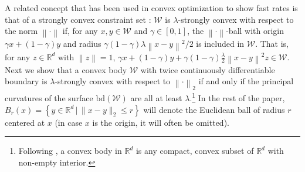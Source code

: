\documentclass[english]{article}
\newcommand{\cW}{\mathcal{W}}
\newcommand{\R}{\mathbb{R}}
\newcommand{\set}[2]{\left\{#1 \,\vert\, #2 \right\}}
\newcommand{\norm}[1]{\left\| #1 \right\|}
\newcommand{\bd}{\mathrm{bd}}
\begin{document}
A related concept that has been used in convex optimization to show fast rates is that of a strongly convex constraint set \citep{LePo66,garber2014faster}:
$\cW$ is $\lambda$-strongly convex with respect to the norm $\norm{\cdot}$ if, for  any $x,y\in \cW$ and $\gamma\in [0,1]$, the $\norm{\cdot}$-ball with origin $\gamma x + (1-\gamma) y$ and radius $\gamma(1-\gamma) \lambda \norm{x-y}^2/2 $ is included in $ \cW$.
That is, for any $z\in \R^d$ with $\norm{z}=1$, $\gamma x + (1-\gamma) y + \gamma(1-\gamma) \frac{\lambda}{2} \norm{x-y}^2 z\in \cW$.
Next we show that a  convex body
$\cW$ with twice continuously differentiable boundary is $\lambda$-strongly convex with respect to $\norm{\cdot}_2$ if and only if the principal curvatures of the surface $\bd(\cW)$ are all at least $\lambda$.\footnote{Following \citet{Sch14:ConvexBodies}, a convex body in $\R^d$ is any compact, convex subset of $\R^d$ with non-empty interior.}
In the rest of the paper, $B_r(x)=\set{y \in \R^d}{ \|x-y\|_2 \le r}$ will denote the Euclidean ball of radius $r$ centered at $x$ (in case $x$ is the origin, it will often be omitted).
\end{document}
